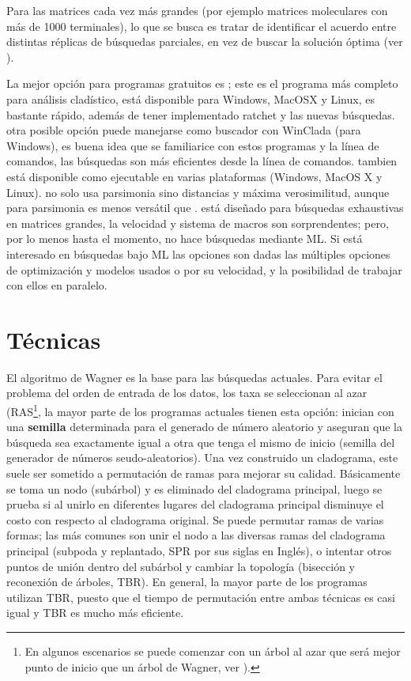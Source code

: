 Para las matrices cada vez m\'as grandes (por ejemplo matrices moleculares con m\'as de 1000 terminales), lo que se busca es tratar de identificar el acuerdo entre distintas r\'eplicas de b\'usquedas parciales, en vez de buscar la soluci\'on \'optima (ver \cite{Farris1996,Goloboff1997,GoloboffFarris2001}). 

La mejor opci\'on para programas gratuitos es ; este es el programa m\'as completo para an\'alisis clad\'istico, est\'a disponible para Windows, MacOSX y Linux, es bastante r\'apido, adem\'as de tener implementado ratchet y las nuevas b\'usquedas.   otra posible opci\'on puede manejarse como buscador con WinClada (para Windows),  es buena idea que se familiarice con estos programas y la l\'inea de comandos, las b\'usquedas son m\'as eficientes desde la l\'inea de comandos.   tambien est\'a disponible como ejecutable en varias plataformas (Windows, MacOS X y Linux).    no solo usa parsimonia sino distancias y m\'axima verosimilitud, aunque para parsimonia es menos vers\'atil que .   est\'a dise\~nado para b\'usquedas exhaustivas en matrices grandes, la velocidad y sistema de macros son sorprendentes; pero, por lo menos hasta el momento, no hace b\'usquedas mediante ML. Si est\'a interesado en b\'usquedas bajo ML las opciones son  dadas las m\'ultiples opciones de optimizaci\'on y modelos usados o  por su velocidad, y la posibilidad de trabajar con ellos en paralelo.

\section*{T\'ecnicas}

El algoritmo de Wagner es la base para las b\'usquedas actuales. Para evitar el problema del orden de entrada de los datos,   los taxa se  seleccionan al azar (RAS\footnote{En algunos escenarios se puede comenzar con un \'arbol al azar que ser\'a mejor punto de inicio que un \'arbol de Wagner, ver \cite{Goloboff2014}).},
la mayor parte de los programas actuales tienen esta opci\'on: inician con una \textbf{semilla} determinada para el generado de n\'umero aleatorio y aseguran que la b\'usqueda sea exactamente igual a otra que tenga el mismo de inicio (semilla del generador de n\'umeros seudo-aleatorios). Una vez construido un cladograma,  este suele ser sometido a permutaci\'on de ramas para mejorar su calidad. B\'asicamente se toma un nodo (sub\'arbol) y es eliminado del cladograma principal,   luego se prueba si al unirlo en diferentes lugares del cladograma principal disminuye el costo con respecto al cladograma original. Se puede permutar ramas de varias formas;  las m\'as comunes son unir el nodo a las diversas ramas del cladograma principal (subpoda y replantado,  SPR por sus siglas en Ingl\'es),  o intentar otros puntos de uni\'on dentro del sub\'arbol y cambiar la topolog\'ia (bisecci\'on y reconexi\'on de \'arboles,  TBR). En general,   la mayor parte de los programas utilizan TBR, 
 puesto que el tiempo de permutaci\'on entre ambas t\'ecnicas es casi igual y TBR es mucho m\'as eficiente.


